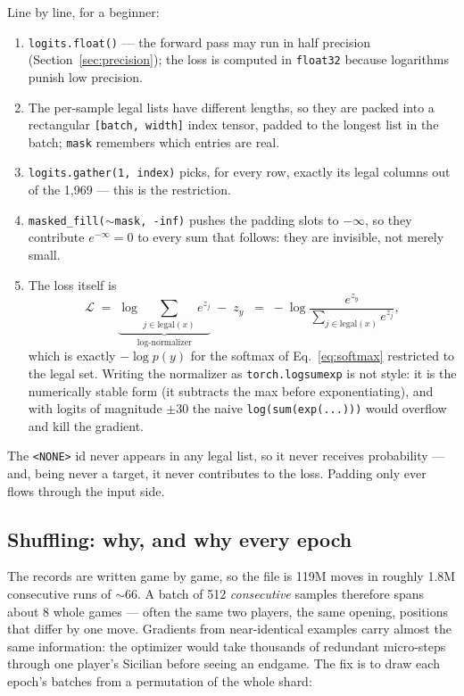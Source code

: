 \documentclass[10pt,a4paper]{article}
\newcommand{\code}[1]{\texttt{#1}}
\newcommand{\loss}{\ensuremath{\mathcal{L}}}
\begin{document}
Line by line, for a beginner:

\begin{enumerate}
\item \code{logits.float()} --- the forward pass may run in half
precision (Section~\ref{sec:precision}); the loss is computed in
\code{float32} because logarithms punish low precision.
\item The per-sample legal lists have different lengths, so they are
packed into a rectangular \code{[batch, width]} index tensor, padded to
the longest list in the batch; \code{mask} remembers which entries are
real.
\item \code{logits.gather(1, index)} picks, for every row, exactly its
legal columns out of the 1{,}969 --- this is the restriction.
\item \code{masked\_fill($\sim$mask, -inf)} pushes the padding slots to
$-\infty$, so they contribute $e^{-\infty}=0$ to every sum that follows:
they are invisible, not merely small.
\item The loss itself is
\begin{equation}
\loss \;=\; \underbrace{\log\sum_{j \in \text{legal}(x)} e^{z_j}}_{\text{log-normalizer}}
\;-\; z_{y}
\;\;=\; -\log \frac{e^{z_y}}{\sum_{j\in\text{legal}(x)} e^{z_j}},
\label{eq:maskedce}
\end{equation}
which is exactly $-\log p(y)$ for the softmax of
Eq.~\eqref{eq:softmax} restricted to the legal set. Writing the
normalizer as \code{torch.logsumexp} is not style: it is the
numerically stable form (it subtracts the max before exponentiating),
and with logits of magnitude $\pm$30 the naive
\code{log(sum(exp(...)))} would overflow and kill the gradient.
\end{enumerate}

The \code{<NONE>} id never appears in any legal list, so it never
receives probability --- and, being never a target, it never
contributes to the loss. Padding only ever flows through the input side.

\subsection{Shuffling: why, and why every epoch}\label{sec:shuffle}

The records are written game by game, so the file is 119M moves in
roughly 1.8M consecutive runs of $\sim$66. A batch of 512 \emph{consecutive}
samples therefore spans about 8 whole games --- often the same two
players, the same opening, positions that differ by one move. Gradients
from near-identical examples carry almost the same information: the
optimizer would take thousands of redundant micro-steps through one
player's Sicilian before seeing an endgame. The fix is to draw each
epoch's batches from a permutation of the whole shard:
\end{document}
